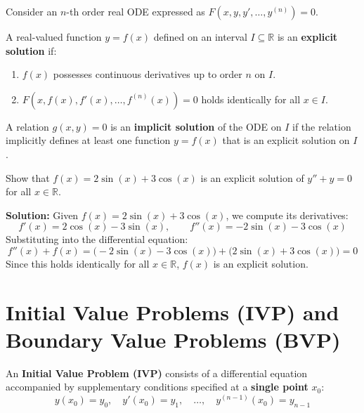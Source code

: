\documentclass[11pt, a4paper, openany, oneside]{book}
\begin{document}
Consider an $n$-th order real ODE expressed as $F\left(x, y, y', \dots, y^{(n)}\right) = 0$.

\begin{definitionbox}
A real-valued function $y = f(x)$ defined on an interval $I \subseteq \mathbb{R}$ is an \textbf{explicit solution} if:
\begin{enumerate}[leftmargin=0.6cm]
\item $f(x)$ possesses continuous derivatives up to order $n$ on $I$.
\item $F\left(x, f(x), f'(x), \dots, f^{(n)}(x)\right) = 0$ holds identically for all $x \in I$.
\end{enumerate}
\end{definitionbox}

\begin{definitionbox}
A relation $g(x,y) = 0$ is an \textbf{implicit solution} of the ODE on $I$ if the relation implicitly defines at least one function $y = f(x)$ that is an explicit solution on $I$.
\end{definitionbox}

\begin{examplebox}
Show that $f(x) = 2\sin(x) + 3\cos(x)$ is an explicit solution of $y'' + y = 0$ for all $x \in \mathbb{R}$.

\textbf{Solution:}
Given $f(x) = 2\sin(x) + 3\cos(x)$, we compute its derivatives:
\[
f'(x) = 2\cos(x) - 3\sin(x), \qquad f''(x) = -2\sin(x) - 3\cos(x)
\]
Substituting into the differential equation:
\[
f''(x) + f(x) = \Big(-2\sin(x) - 3\cos(x)\Big) + \Big(2\sin(x) + 3\cos(x)\Big) = 0
\]
Since this holds identically for all $x \in \mathbb{R}$, $f(x)$ is an explicit solution.
\end{examplebox}

\section{Initial Value Problems (IVP) and Boundary Value Problems (BVP)}

\begin{definitionbox}
An \textbf{Initial Value Problem (IVP)} consists of a differential equation accompanied by supplementary conditions specified at a \textbf{single point} $x_0$:
\begin{equation}
    y(x_0) = y_0, \quad y'(x_0) = y_1, \quad \dots, \quad y^{(n-1)}(x_0) = y_{n-1}
\end{equation}
\end{definitionbox}
\end{document}
